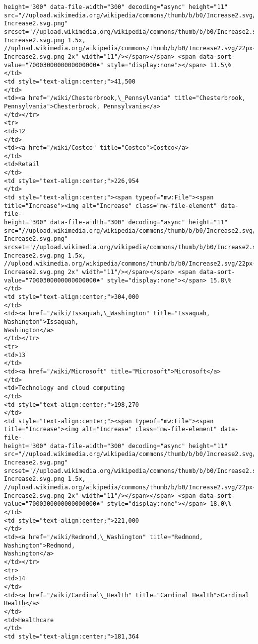 \documentclass[11pt]{article}
\begin{document}
\begin{Verbatim}[commandchars=\\\{\}]
height="300" data-file-width="300" decoding="async" height="11"
src="//upload.wikimedia.org/wikipedia/commons/thumb/b/b0/Increase2.svg/11px-
Increase2.svg.png"
srcset="//upload.wikimedia.org/wikipedia/commons/thumb/b/b0/Increase2.svg/17px-
Increase2.svg.png 1.5x,
//upload.wikimedia.org/wikipedia/commons/thumb/b/b0/Increase2.svg/22px-
Increase2.svg.png 2x" width="11"/></span></span> <span data-sort-
value="7000300000000000000♠" style="display:none"></span> 11.5\%
</td>
<td style="text-align:center;">41,500
</td>
<td><a href="/wiki/Chesterbrook,\_Pennsylvania" title="Chesterbrook,
Pennsylvania">Chesterbrook, Pennsylvania</a>
</td></tr>
<tr>
<td>12
</td>
<td><a href="/wiki/Costco" title="Costco">Costco</a>
</td>
<td>Retail
</td>
<td style="text-align:center;">226,954
</td>
<td style="text-align:center;"><span typeof="mw:File"><span
title="Increase"><img alt="Increase" class="mw-file-element" data-file-
height="300" data-file-width="300" decoding="async" height="11"
src="//upload.wikimedia.org/wikipedia/commons/thumb/b/b0/Increase2.svg/11px-
Increase2.svg.png"
srcset="//upload.wikimedia.org/wikipedia/commons/thumb/b/b0/Increase2.svg/17px-
Increase2.svg.png 1.5x,
//upload.wikimedia.org/wikipedia/commons/thumb/b/b0/Increase2.svg/22px-
Increase2.svg.png 2x" width="11"/></span></span> <span data-sort-
value="7000300000000000000♠" style="display:none"></span> 15.8\%
</td>
<td style="text-align:center;">304,000
</td>
<td><a href="/wiki/Issaquah,\_Washington" title="Issaquah, Washington">Issaquah,
Washington</a>
</td></tr>
<tr>
<td>13
</td>
<td><a href="/wiki/Microsoft" title="Microsoft">Microsoft</a>
</td>
<td>Technology and cloud computing
</td>
<td style="text-align:center;">198,270
</td>
<td style="text-align:center;"><span typeof="mw:File"><span
title="Increase"><img alt="Increase" class="mw-file-element" data-file-
height="300" data-file-width="300" decoding="async" height="11"
src="//upload.wikimedia.org/wikipedia/commons/thumb/b/b0/Increase2.svg/11px-
Increase2.svg.png"
srcset="//upload.wikimedia.org/wikipedia/commons/thumb/b/b0/Increase2.svg/17px-
Increase2.svg.png 1.5x,
//upload.wikimedia.org/wikipedia/commons/thumb/b/b0/Increase2.svg/22px-
Increase2.svg.png 2x" width="11"/></span></span> <span data-sort-
value="7000300000000000000♠" style="display:none"></span> 18.0\%
</td>
<td style="text-align:center;">221,000
</td>
<td><a href="/wiki/Redmond,\_Washington" title="Redmond, Washington">Redmond,
Washington</a>
</td></tr>
<tr>
<td>14
</td>
<td><a href="/wiki/Cardinal\_Health" title="Cardinal Health">Cardinal Health</a>
</td>
<td>Healthcare
</td>
<td style="text-align:center;">181,364

\end{Verbatim}
\end{document}
